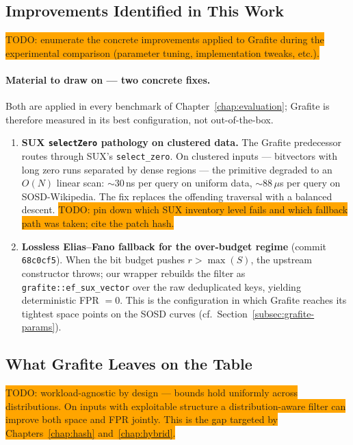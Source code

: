 \subsection{Improvements Identified in This Work}
\label{subsec:grafite-improvements}

\colorbox{orange}{TODO: enumerate the concrete improvements applied to Grafite during the experimental comparison (parameter tuning, implementation tweaks, etc.).}

\paragraph{Material to draw on --- two concrete fixes.}
Both are applied in every benchmark of
Chapter~\ref{chap:evaluation}; Grafite is therefore measured in
its best configuration, not out-of-the-box.

\begin{enumerate}
    \item \textbf{SUX \texttt{selectZero} pathology on clustered
    data.} The Grafite predecessor routes through SUX's
    \texttt{select\_zero}. On clustered inputs --- bitvectors with
    long zero runs separated by dense regions --- the primitive
    degraded to an $O(N)$ linear scan: $\sim 30$\,ns per query
    on uniform data, $\sim 88\,\mu$s per query on SOSD-Wikipedia.
    The fix replaces the offending traversal with a balanced
    descent.
    \colorbox{orange}{TODO: pin down which SUX inventory level fails and which fallback path was taken; cite the patch hash.}

    \item \textbf{Lossless Elias--Fano fallback for the
    over-budget regime} (commit \texttt{68c0cf5}). When the bit
    budget pushes $r > \max(S)$, the upstream constructor throws;
    our wrapper rebuilds the filter as
    \texttt{grafite::ef\_sux\_vector} over the raw deduplicated
    keys, yielding deterministic FPR $= 0$. This is the
    configuration in which Grafite reaches its tightest space
    points on the SOSD curves
    (cf.~Section~\ref{subsec:grafite-params}).
\end{enumerate}

\subsection{What Grafite Leaves on the Table}
\label{subsec:grafite-gap}

\colorbox{orange}{TODO: workload-agnostic by design --- bounds hold uniformly across distributions. On inputs with exploitable structure a distribution-aware filter can improve both space and FPR jointly. This is the gap targeted by Chapters~\ref{chap:hash} and~\ref{chap:hybrid}.}

